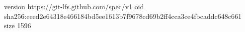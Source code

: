 version https://git-lfs.github.com/spec/v1
oid sha256:eeed2e64318e466184bd5ee1613b7f9678cd69b2ff4cca3ce4fbcaddc648c661
size 1596
